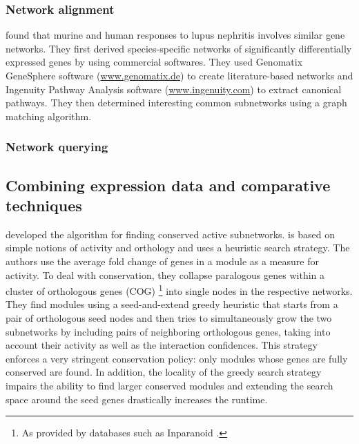 		\subsubsection{Network alignment}
		\label{subsec:netalignment}

		\Textcite{berthier2012cross} found that murine and human responses to lupus nephritis involves similar gene networks.
		They first derived species-specific networks of significantly differentially expressed genes by using commercial softwares.
		They used Genomatix GeneSphere software (\url{www.genomatix.de}) to create literature-based networks and Ingenuity Pathway Analysis software (\url{www.ingenuity.com}) to extract canonical pathways.
		They then determined interesting common subnetworks using a graph matching algorithm.

		\subsubsection{Network querying}
		\label{subsec:substructure}


		\subsection{Combining expression data and comparative techniques}
		\label{subsec:combining}

		\Textcite{deshpande2010scalable} developed the \nexus{} algorithm for finding conserved active subnetworks.
		\nexus{} is based on simple notions of activity and orthology and uses a heuristic search strategy.
		The authors use the average fold change of genes in a module as a measure for activity.
		To deal with conservation, they collapse paralogous genes within a cluster of orthologous genes (COG) \parencite{tatusov1997genomic}\footnote{As provided by databases such as Inparanoid \parencite{obrien2005inparanoid}.} into single nodes in the respective networks.
		They find modules using a seed-and-extend greedy heuristic that starts from a pair of orthologous seed nodes and then tries to simultaneously grow the two subnetworks by including pairs of neighboring orthologous genes, taking into account their activity as well as the interaction confidences.
		This strategy enforces a very stringent conservation policy: only modules whose genes are fully conserved are found.
		In addition, the locality of the greedy search strategy impairs the ability to find larger conserved modules and extending the search space around the seed genes drastically increases the runtime.

